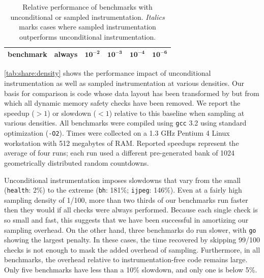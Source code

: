 \begin{table}
  \centering
  \begin{tabular}{|l|r|rrrr|}
    \hline
    \rule{0pt}{2.5ex}
    \textbf{benchmark} & \textbf{always} & $\mathbf{10^{-2}}$ & $\mathbf{10^{-3}}$ & $\mathbf{10^{-4}}$ & $\mathbf{10^{-6}}$ \\
    \hline\hline
    
  \end{tabular}
  \caption{Relative performance of \CCured benchmarks with
    unconditional or sampled instrumentation.  \textit{Italics} marks
    cases where sampled instrumentation outperforms unconditional
    instrumentation.}
  \label{tab:share:density}
\end{table}

\autoref{tab:share:density} shows the performance impact of
unconditional instrumentation as well as sampled instrumentation at
various densities.  Our basis for comparison is code whose data layout
has been transformed by \CCured but from which all dynamic memory
safety checks have been removed.  We report the speedup ($>1$) or
slowdown ($<1$) relative to this baseline when sampling at various
densities.  All benchmarks were compiled using \texttt{gcc} 3.2 using
standard optimization (\texttt{-O2}).  Times were collected on a 1.3
GHz Pentium 4 Linux workstation with 512 megabytes of RAM\@.  Reported
speedups represent the average of four runs; each run used a different
pre-generated bank of 1024 geometrically distributed random
countdowns.

Unconditional instrumentation imposes slowdowns that vary from the
small (\texttt{health}: 2\%) to the extreme (\texttt{bh}: 181\%;
\texttt{ijpeg}: 146\%).  Even at a fairly high sampling density of
1/100, more than two thirds of our benchmarks run faster then they
would if all checks were always performed.  Because each single check
is so small and fast, this suggests that we have been successful in
amortizing our sampling overhead.  On the other hand, three benchmarks
do run slower, with \texttt{go} showing the largest penalty.  In these
cases, the time recovered by skipping 99/100 checks is not enough to
mask the added overhead of sampling.  Furthermore, in all benchmarks,
the overhead relative to instrumentation-free code remains large.
Only five benchmarks have less than a 10\% slowdown, and only one is
below 5\%.

